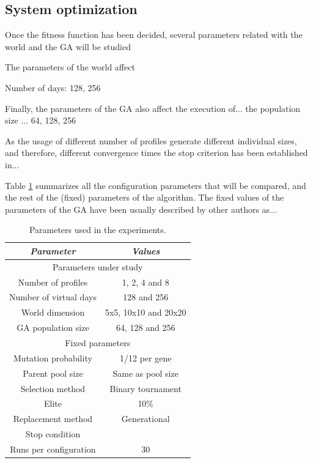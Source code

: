 \documentclass[runningheads,a4paper]{llncs}
\begin{document}
\subsection{System optimization}

Once the fitness function has been decided, several parameters related with the world and the GA will be studied

The parameters of the world affect  %


Number of days: 128, 256


Finally, the parameters of the GA also affect the execution of... the
population size ... 64, 128, 256 %

As the usage of different number of profiles generate different
individual sizes, and therefore, different convergence times the stop
criterion has been established in... %

Table \ref{tab:parameters} summarizes all the configuration parameters that will be compared, and the rest of the (fixed) parameters of the algorithm. The fixed values of the parameters of the GA have been usually described by other authors as...

\begin{table}
\begin{center}
\begin{tabular}{|c|c|}
\hline
{\em Parameter} & {\em Values} \\\hline \hline
\multicolumn{2}{c}{Parameters under study} \\ \hline \hline
Number of profiles & 1, 2, 4 and 8 \\\hline
Number of virtual days &  128 and 256 \\ \hline
World dimension &  5x5, 10x10 and 20x20 \\ \hline
GA population size & 64, 128 and 256 \\ \hline
\multicolumn{2}{c}{Fixed parameters} \\ \hline \hline
Mutation probability & 1/12 per gene \\ \hline
Parent pool size & Same as pool size \\ \hline
Selection method & Binary tournament \\ \hline 
Elite & 10\%  \\ \hline
Replacement method & Generational\\ \hline
Stop condition & \\ \hline %
Runs per configuration & 30 \\ \hline
\end{tabular}
\caption{Parameters used in the experiments.}
\label{tab:parameters}
\end{center}
\end{table}
\end{document}
